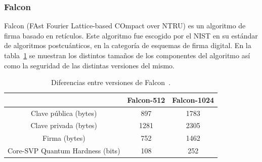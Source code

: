 
\subsubsection{Falcon}\label{subsubsec:falcon}

Falcon (FAst Fourier Lattice-based COmpact over NTRU) es un algoritmo de firma basado en retículos.
Este algoritmo fue escogido por el \ac{NIST} en su estándar de algoritmos postcuánticos, en la categoría de esquemas de firma digital.
En la tabla~\ref{tab:falcon} se muestran los distintos tamaños de los componentes del algoritmo así como la seguridad de las distintas versiones del mismo.

\begin{table}[H]
    \centering
    \begin{tabular}{|c|c|c|}
    \hline
                                & \textbf{Falcon-512}   & \textbf{Falcon-1024}  \\ \hline
    Clave pública (bytes)       & 897                   & 1783                  \\ \hline
    Clave privada (bytes)       & 1281                  & 2305                  \\ \hline
    Firma (bytes)               & 752                   & 1462                  \\ \hline
    Core-SVP Quantum Hardness (bits)               & 108                   & 252                   \\ \hline
    \end{tabular}
    \caption{Diferencias entre versiones de Falcon~\cite{falcon_spec}.}
    \label{tab:falcon}
\end{table}


